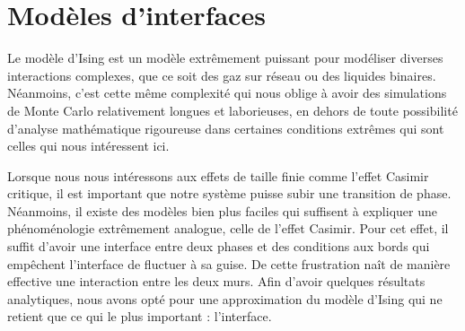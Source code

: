 \chapter{Modèles d'interfaces}


Le modèle d'Ising est un modèle extrêmement puissant pour modéliser diverses interactions complexes, que ce soit des gaz sur réseau ou des liquides binaires. Néanmoins, c'est cette même complexité qui nous oblige à avoir des simulations de Monte Carlo relativement longues et laborieuses, en dehors de toute possibilité d'analyse mathématique rigoureuse dans certaines conditions extrêmes qui sont celles qui nous intéressent ici. 

Lorsque nous nous intéressons aux effets de taille finie comme l'effet Casimir critique\cite{}, il est important que notre système puisse subir une transition de phase. Néanmoins, il existe des modèles bien plus faciles qui suffisent à expliquer une phénoménologie extrêmement analogue, celle de l'effet Casimir. Pour cet effet, il suffit d'avoir une interface entre deux phases et des conditions aux bords qui empêchent l'interface de fluctuer à sa guise. De cette frustration naît de manière effective une interaction entre les deux murs. Afin d'avoir quelques résultats analytiques, nous avons opté pour une approximation du modèle d'Ising qui ne retient que ce qui le plus important : l'interface.

